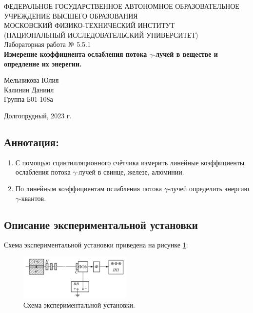 \documentclass[a4paper,12pt]{article} %
\begin{document}
\begin{center}
	\footnotesize{ФЕДЕРАЛЬНОЕ ГОСУДАРСТВЕННОЕ АВТОНОМНОЕ ОБРАЗОВАТЕЛЬНОЕ 			УЧРЕЖДЕНИЕ ВЫСШЕГО ОБРАЗОВАНИЯ}\\
	\footnotesize{МОСКОВСКИЙ ФИЗИКО-ТЕХНИЧЕСКИЙ ИНСТИТУТ\\(НАЦИОНАЛЬНЫЙ 			ИССЛЕДОВАТЕЛЬСКИЙ УНИВЕРСИТЕТ)}\\
	\hfill \break
	\hfill\break
	\hfill\break
	\hfill \break
	\hfill \break
	\hfill \break
	\hfill \break
	\hfill \break
	\hfill \break
	\hfill \break
	\hfill \break
	\hfill \break
	\hfill \break
	\hfill \break
	\large{Лабораторная работа № 5.5.1 \\\textbf{Измерение коэффициента ослабления потока $\gamma$-лучей в веществе и опредление их энерегии.}}\\
	\hfill \break
	\hfill \break
	\hfill \break
	\begin{flushright}
		Мельникова Юлия\\
        Калинин Даниил\\
		Группа Б01-108а
	\end{flushright}
	\hfill \break
	\hfill \break
	\hfill \break
	\hfill \break
	\hfill \break
	\hfill \break
	\hfill \break
	\hfill \break
	\hfill \break

\end{center}
\begin{center}
	Долгопрудный, 2023 г.
\end{center}
\thispagestyle{empty}
\newpage


	\subsection*{Аннотация:}
	\begin{enumerate}
		\item С помощью сцинтилляционного счётчика измерить линейные коэффициенты ослабления потока $\gamma$-лучей в свинце, железе, алюминии.
		
		\item По линейным коэффициентам ослабления потока $\gamma$-лучей определить энергию $\gamma$-квантов.
	\end{enumerate}
	
	\subsection*{Описание экспериментальной установки}
	
	Схема экспериментальной установки приведена на рисунке \ref{img:exp_scheme}:
	\begin{figure}[H]
		\centering
		\includegraphics[width=0.5\textwidth]{images/exp_scheme.png}
		\caption{Схема экспериментальной установки.}
		\label{img:exp_scheme}
	\end{figure}
\end{document}
